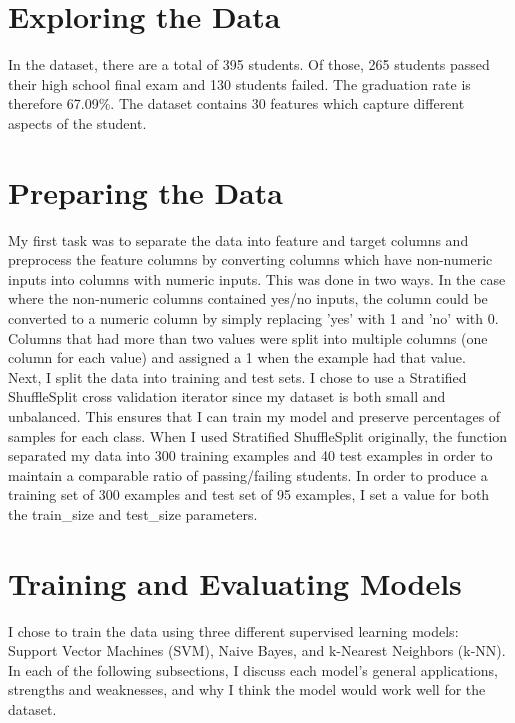 \documentclass[11pt]{article}
\begin{document}
\section{Exploring the Data}

In the dataset, there are a total of 395 students. Of those, 265 students passed their high school final exam and 130 students failed. The graduation rate is therefore 67.09\%. The dataset contains 30 features which capture different aspects of the student.\\

\section{Preparing the Data}

My first task was to separate the data into feature and target columns and preprocess the feature columns by converting columns which have non-numeric inputs into columns with numeric inputs. This was done in two ways. In the case where the non-numeric columns contained yes/no inputs, the column could be converted to a numeric column by simply replacing 'yes' with 1 and 'no' with 0.\\

Columns that had more than two values were split into multiple columns (one column for each value) and assigned a 1 when the example had that value.\\

Next, I split the data into training and test sets. I chose to use a Stratified ShuffleSplit cross validation iterator since my dataset is both small and unbalanced. This ensures that I can train my model and preserve percentages of samples for each class. When I used Stratified ShuffleSplit originally, the function separated my data into 300 training examples and 40 test examples in order to maintain a comparable ratio of passing/failing students.  In order to produce a training set of 300 examples and test set of 95 examples, I set a value for both the train\_size and test\_size parameters.

\section{Training and Evaluating Models}

I chose to train the data using three different supervised learning models: Support Vector Machines (SVM), Naive Bayes, and k-Nearest Neighbors (k-NN). In each of the following subsections, I discuss each model's general applications, strengths and weaknesses, and why I think the model would work well for the dataset.
\end{document}
